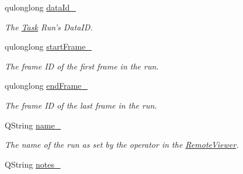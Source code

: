 \begin{DoxyCompactItemize}
\item 
\hypertarget{struct_picto_1_1_file_session_loader_1_1_run_data_a7b99ac854f0320d4959c10cf288a55aa}{qulonglong \hyperlink{struct_picto_1_1_file_session_loader_1_1_run_data_a7b99ac854f0320d4959c10cf288a55aa}{data\-Id\-\_\-}}\label{struct_picto_1_1_file_session_loader_1_1_run_data_a7b99ac854f0320d4959c10cf288a55aa}

\begin{DoxyCompactList}\small\item\em The \hyperlink{class_picto_1_1_task}{Task} Run's Data\-I\-D. \end{DoxyCompactList}\item 
\hypertarget{struct_picto_1_1_file_session_loader_1_1_run_data_ac2523539bffa43cf2ee22a5d6fe6ae08}{qulonglong \hyperlink{struct_picto_1_1_file_session_loader_1_1_run_data_ac2523539bffa43cf2ee22a5d6fe6ae08}{start\-Frame\-\_\-}}\label{struct_picto_1_1_file_session_loader_1_1_run_data_ac2523539bffa43cf2ee22a5d6fe6ae08}

\begin{DoxyCompactList}\small\item\em The frame I\-D of the first frame in the run. \end{DoxyCompactList}\item 
\hypertarget{struct_picto_1_1_file_session_loader_1_1_run_data_ad5c79f8f4ad716fd8717e3340df0d6aa}{qulonglong \hyperlink{struct_picto_1_1_file_session_loader_1_1_run_data_ad5c79f8f4ad716fd8717e3340df0d6aa}{end\-Frame\-\_\-}}\label{struct_picto_1_1_file_session_loader_1_1_run_data_ad5c79f8f4ad716fd8717e3340df0d6aa}

\begin{DoxyCompactList}\small\item\em The frame I\-D of the last frame in the run. \end{DoxyCompactList}\item 
\hypertarget{struct_picto_1_1_file_session_loader_1_1_run_data_a419ebdcc36af209f2024a74329574503}{Q\-String \hyperlink{struct_picto_1_1_file_session_loader_1_1_run_data_a419ebdcc36af209f2024a74329574503}{name\-\_\-}}\label{struct_picto_1_1_file_session_loader_1_1_run_data_a419ebdcc36af209f2024a74329574503}

\begin{DoxyCompactList}\small\item\em The name of the run as set by the operator in the \hyperlink{class_remote_viewer}{Remote\-Viewer}. \end{DoxyCompactList}\item 
\hypertarget{struct_picto_1_1_file_session_loader_1_1_run_data_af617e78c593f76e2fea60eb3417ac53d}{Q\-String \hyperlink{struct_picto_1_1_file_session_loader_1_1_run_data_af617e78c593f76e2fea60eb3417ac53d}{notes\-\_\-}}\label{struct_picto_1_1_file_session_loader_1_1_run_data_af617e78c593f76e2fea60eb3417ac53d}


\end{DoxyCompactItemize}
